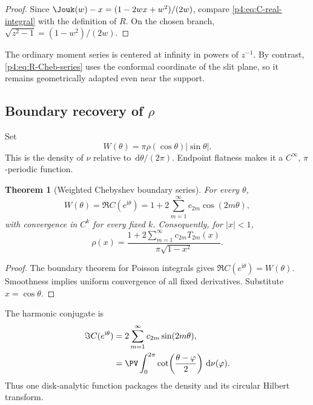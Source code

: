 \documentclass[11pt,oneside]{article}
\newtheorem{theorem}{Theorem}[section]
\theoremstyle{definition}
\newcommand{\dd}{\,\mathrm d}
\newcommand{\ii}{\mathrm i}
\begin{document}
\begin{proof}
Since \(\Jouk(w)-x=(1-2wx+w^2)/(2w)\), compare \eqref{p4:eq:C-real-integral} with the
definition of \(R\). On the chosen branch, \(\sqrt{z^2-1}=(1-w^2)/(2w)\).
\end{proof}

The ordinary moment series is centered at infinity in powers of \(z^{-1}\). By contrast,
\eqref{p4:eq:R-Cheb-series} uses the conformal coordinate of the slit plane, so it remains
geometrically adapted even near the support.

\subsection{Boundary recovery of \(\rho\)}

Set
\begin{equation}
 W(\theta)=\pi\rho(\cos\theta)|\sin\theta|.
 \label{p4:eq:W-def}
\end{equation}
This is the density of \(\nu\) relative to \(\dd\theta/(2\pi)\). Endpoint flatness makes it a
\(C^\infty\), \(\pi\)-periodic function.

\begin{theorem}[Weighted Chebyshev boundary series]
\label{p4:thm:boundary-rho}
For every \(\theta\),
\begin{equation}
 W(\theta)=\Re C(e^{\ii\theta})
 =1+2\sum_{m=1}^{\infty}c_{2m}\cos(2m\theta),
 \label{p4:eq:W-Fourier}
\end{equation}
with convergence in \(C^k\) for every fixed \(k\). Consequently, for \(|x|<1\),
\begin{equation}
 \boxed{\displaystyle
 \rho(x)=\frac{1+2\sum_{m=1}^{\infty}c_{2m}T_{2m}(x)}
 {\pi\sqrt{1-x^2}}.}
 \label{p4:eq:rho-weighted-Cheb}
\end{equation}
\end{theorem}

\begin{proof}
The boundary theorem for Poisson integrals gives \(\Re C(e^{\ii\theta})=W(\theta)\). Smoothness
implies uniform convergence of all fixed derivatives. Substitute \(x=\cos\theta\).
\end{proof}

The harmonic conjugate is
\begin{align}
 \Im C(e^{\ii\theta})
 &=2\sum_{m=1}^{\infty}c_{2m}\sin(2m\theta),
 \label{p4:eq:C-imag-series}\\
 &=\PV\int_0^{2\pi}\cot\!\left(\frac{\theta-\varphi}{2}\right)\dd\nu(\varphi).
 \label{p4:eq:C-Hilbert}
\end{align}
Thus one disk-analytic function packages the density and its circular Hilbert transform.
\end{document}
